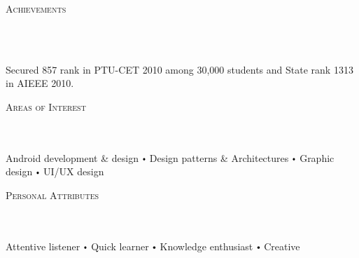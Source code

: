 \documentclass{article}
\newcommand{\header}[1]{{
\hspace*{-15pt}\vspace*{6pt} \textsc{#1}} \vspace*{-6pt} 
\lineunder
}
\newcommand{\lineunder}{
\vspace*{-8pt} \\ \hspace*{-18pt} 
\hrulefill \\
}
\newcommand{\content}{
\vspace*{2pt}%
}
\renewcommand{\labelitemi}{
$\vcenter{\hbox{\tiny$\bullet$}}$\hspace*{3pt}
}
\renewcommand{\labelitemii}{
$\vcenter{\hbox{\tiny$\bullet$}}$\hspace*{-3pt}
}
\newenvironment{bullet-list-major}{
\begin{list}{\labelitemii}{\setlength\leftmargin{3pt} 
\topsep 0pt \itemsep -2pt}}{\vspace*{4pt}\end{list}
}
\begin{document}
\vspace*{4pt}%
\header{Achievements}
    \begin{bullet-list-major}
    \item Secured 857 rank in PTU-CET 2010 among 30,000 students and State rank 1313 in AIEEE 2010.
    \end{bullet-list-major}

\vspace*{4pt}%
\header{Areas of Interest}
    \content{Android development \& design \labelitemi Design patterns \& Architectures \labelitemi Graphic design \labelitemi UI/UX design \vspace{5pt}}

\vspace*{4pt}%
\header{Personal Attributes}
    \content{Attentive listener \labelitemi Quick learner \labelitemi Knowledge enthusiast \labelitemi Creative\vspace{5pt}}
\end{document}
